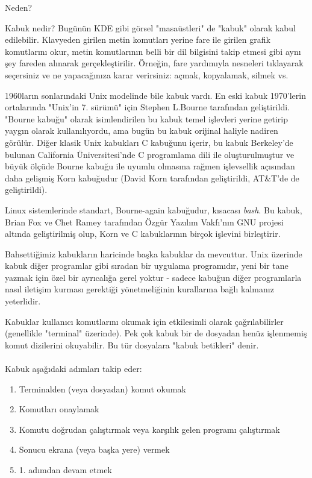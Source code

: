 \begin{section}{Neden?}
\begin{subsection}{Kabuk nedir?}
Bugünün KDE gibi görsel "masaüstleri" de "kabuk" olarak kabul edilebilir. Klavyeden girilen metin komutları yerine fare ile girilen grafik komutlarını okur, metin komutlarının belli bir dil bilgisini takip etmesi gibi aynı şey fareden alınarak gerçekleştirilir. Örneğin, fare yardımıyla nesneleri tıklayarak seçersiniz ve ne yapacağınıza karar verirsiniz: açmak, kopyalamak, silmek vs.

1960ların sonlarındaki Unix modelinde bile kabuk vardı. En eski kabuk 1970'lerin ortalarında "Unix'in 7. sürümü" için Stephen L.Bourne tarafından geliştirildi. "Bourne kabuğu" olarak isimlendirilen bu kabuk temel işlevleri yerine getirip yaygın olarak kullanılıyordu, ama bugün bu kabuk orijinal haliyle nadiren görülür. Diğer klasik Unix kabukları C kabuğunu içerir, bu kabuk Berkeley'de bulunan California Üniversitesi'nde C programlama dili ile oluşturulmuştur ve büyük ölçüde Bourne kabuğu ile uyumlu olmasına rağmen işlevsellik açısından daha gelişmiş Korn kabuğudur (David Korn tarafından geliştirildi, AT\&T'de de geliştirildi).

Linux sistemlerinde standart, Bourne-again kabuğudur, kısacası \emph{bash}. Bu kabuk, Brian Fox ve Chet Ramey tarafından Özgür Yazılım Vakfı'nın GNU projesi altında geliştirilmiş olup, Korn ve C kabuklarının birçok işlevini birleştirir.

Bahsettiğimiz kabukların haricinde başka kabuklar da mevcuttur. Unix üzerinde kabuk diğer programlar gibi sıradan bir uygulama programıdır, yeni bir tane yazmak için özel bir ayrıcalığa gerel yoktur - sadece kabuğun diğer programlarla nasıl iletişim kurması gerektiği yönetmeliğinin kurallarına bağlı kalmanız yeterlidir.

Kabuklar kullanıcı komutlarını okumak için etkilesimli olarak çağrılabilirler (genellikle "terminal" üzerinde). Pek çok kabuk bir de dosyadan henüz işlenmemiş komut dizilerini okuyabilir. Bu tür dosyalara "kabuk betikleri" denir.
\paragraph{}{Kabuk aşağıdaki adımları takip eder:
\begin{enumerate}
\item Terminalden (veya dosyadan) komut okumak
\item Komutları onaylamak
\item Komutu doğrudan çalıştırmak veya karşılık gelen programı çalıştırmak
\item Sonucu ekrana (veya başka yere) vermek
\item 1. adımdan devam etmek
\end{enumerate}}


\end{subsection}
\end{section}

